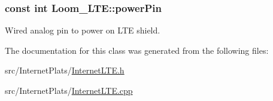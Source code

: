 \subsubsection[{\texorpdfstring{power\+Pin}{powerPin}}]{\setlength{\rightskip}{0pt plus 5cm}const int Loom\+\_\+\+L\+T\+E\+::power\+Pin\hspace{0.3cm}{\ttfamily [protected]}}\hypertarget{class_loom___l_t_e_a2957c4ed2f16b6e5d5efcf26a54ab6f1}{}\label{class_loom___l_t_e_a2957c4ed2f16b6e5d5efcf26a54ab6f1}


Wired analog pin to power on L\+TE shield. 



The documentation for this class was generated from the following files\+:\begin{DoxyCompactItemize}
\item 
src/\+Internet\+Plats/\hyperlink{_internet_l_t_e_8h}{Internet\+L\+T\+E.\+h}\item 
src/\+Internet\+Plats/\hyperlink{_internet_l_t_e_8cpp}{Internet\+L\+T\+E.\+cpp}\end{DoxyCompactItemize}
